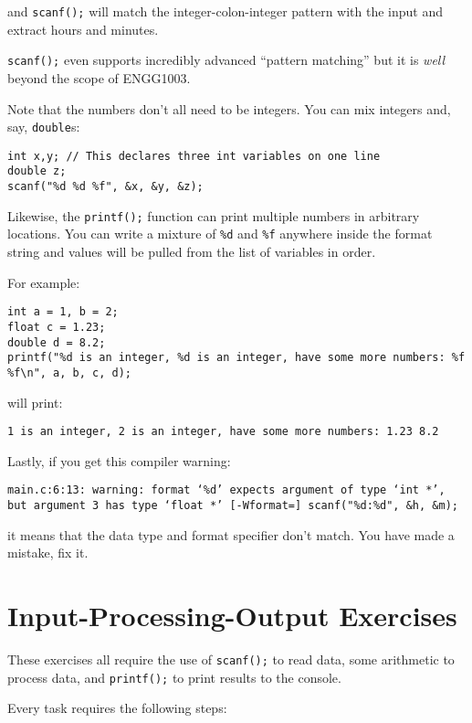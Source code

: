 \documentclass{lab}
\begin{document}
and \texttt{scanf();} will match the integer-colon-integer pattern with the input and extract hours and minutes.

\texttt{scanf();} even supports incredibly advanced ``pattern matching'' but it is \textit{well} beyond the scope of ENGG1003.

Note that the numbers don't all need to be integers. You can mix integers and, say, \texttt{double}s:

\begin{lstlisting}[style=CStyle]
int x,y; // This declares three int variables on one line
double z;
scanf("%d %d %f", &x, &y, &z);
\end{lstlisting}

Likewise, the \texttt{printf();} function can print multiple numbers in arbitrary locations. You can write a mixture of \texttt{\%d} and \texttt{\%f} anywhere inside the format string and values will be pulled from the list of variables in order.

For example:

\begin{lstlisting}[style=CStyle]
int a = 1, b = 2;
float c = 1.23;
double d = 8.2;
printf("%d is an integer, %d is an integer, have some more numbers: %f %f\n", a, b, c, d);
\end{lstlisting}

will print:

\texttt{1 is an integer, 2 is an integer, have some more numbers: 1.23 8.2}

Lastly, if you get this compiler warning:


\texttt{main.c:6:13: warning: format ‘\%d’ expects argument of type ‘int *’, but argument 3 has type ‘float *’ [-Wformat=]
  scanf("\%d:\%d", \&h, \&m);}


it means that the data type and format specifier don't match. You have made a mistake, fix it.


\pagebreak
\section{Input-Processing-Output Exercises}

These exercises all require the use of \texttt{scanf();} to read data, some arithmetic to process data, and \texttt{printf();} to print results to the console.

Every task requires the following steps:
\end{document}
